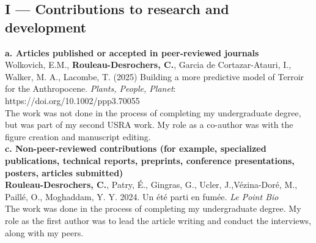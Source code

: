 \documentclass[12pt]{article}
\begin{document}






\subsection*{I --- Contributions to research and development}
\textbf{a. Articles published or accepted in peer-reviewed journals} \\
Wolkovich, E.M., \textbf{Rouleau-Desrochers, C.}, Garcia de Cortazar-Atauri, I., Walker, M. A., Lacombe,
T. (2025) Building a more predictive model of Terroir for the Anthropocene. \textit{Plants, People, Planet}: https://doi.org/10.1002/ppp3.70055 \\
The work was not done in the process of completing my undergraduate degree, but was part of my second USRA work. My role as a co-author was with the figure creation and manuscript editing. \\

\textbf{c. Non-peer-reviewed contributions (for example, specialized publications, technical reports, preprints, conference presentations, posters, articles submitted)} \\
\textbf{Rouleau-Desrochers, C.}, Patry, É., Gingras, G., Ucler, J.,Vézina-Doré, M., Paillé, O., Moghaddam, Y. Y. 2024. Un été parti en fumée. \textit{Le Point Bio} \\
The work was done in the process of completing my undergraduate degree. My role as the first author was to lead the article writing and conduct the interviews, along with my peers.

\end{document}
